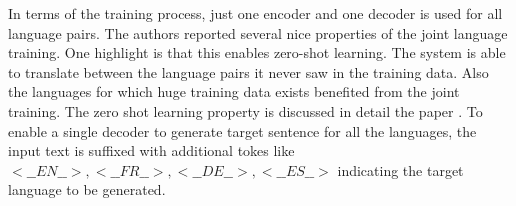 \documentclass[conference]{IEEEtran}
\begin{document}
 In terms of the training process, just one encoder and one decoder is used for all language pairs. The authors reported several nice properties of the joint language training. One highlight is that this enables zero-shot learning. The system is able to translate between the language pairs it never saw in the training data. Also the languages for which huge training data exists benefited from the joint training. The zero shot learning property is discussed in detail the paper \cite{johnson2016google}. To enable a single decoder to generate target sentence for all the languages, the input text is suffixed with additional tokes like  $<\_\_EN\_\_>, <\_\_FR\_\_>, <\_\_DE\_\_>, <\_\_ES\_\_>$ indicating the target language to be generated.











\end{document}
